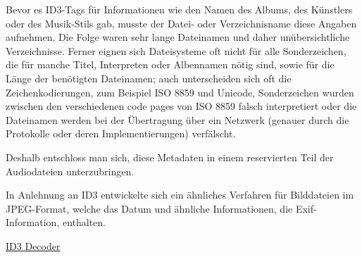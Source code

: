 Bevor es ID3-Tags für Informationen wie den Namen des Albums, des Künstlers oder des Musik-Stils gab, musste der Datei- oder Verzeichnisname diese Angaben aufnehmen. Die Folge waren sehr lange Dateinamen und daher unübersichtliche Verzeichnisse. Ferner eignen sich Dateisysteme oft nicht für alle Sonderzeichen, die für manche Titel, Interpreten oder Albennamen nötig sind, sowie für die Länge der benötigten Dateinamen; auch unterscheiden sich oft die Zeichenkodierungen, zum Beispiel ISO 8859 und Unicode, Sonderzeichen wurden zwischen den verschiedenen code pages von ISO 8859 falsch interpretiert oder die Dateinamen werden bei der Übertragung über ein Netzwerk (genauer durch die Protokolle oder deren Implementierungen) verfälscht.

Deshalb entschloss man sich, diese Metadaten in einem reservierten Teil der Audiodateien unterzubringen.

In Anlehnung an ID3 entwickelte sich ein ähnliches Verfahren für Bilddateien im JPEG-Format, welche das Datum und ähnliche Informationen, die Exif-Information, enthalten.

\href{https://github.com/mikkyang/id3-go}{ID3 Decoder}
